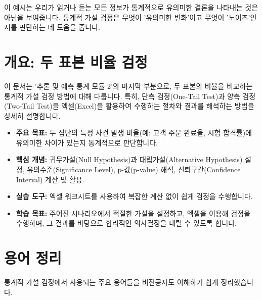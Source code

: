 \documentclass[11pt,a4paper]{book}
\theoremstyle{definition}
\begin{document}
\begin{warningbox}[title=통계적 유의성과 뉴스 가치]
이 예시는 우리가 읽거나 듣는 모든 정보가 통계적으로 유의미한 결론을 나타내는 것은 아님을 보여줍니다. 통계적 가설 검정은 무엇이 '유의미한 변화'이고 무엇이 '노이즈'인지를 판단하는 데 도움을 줍니다.
\end{warningbox}


\section{개요: 두 표본 비율 검정}

이 문서는 '추론 및 예측 통계 모듈 2'의 마지막 부분으로, 두 표본의 비율을 비교하는 통계적 가설 검정 방법에 대해 다룹니다. 특히, 단측 검정(One-Tail Test)과 양측 검정(Two-Tail Test)을 엑셀(Excel)을 활용하여 수행하는 절차와 결과를 해석하는 방법을 상세히 설명합니다.

\begin{itemize}
    \item \textbf{주요 목표:} 두 집단의 특정 사건 발생 비율(예: 고객 주문 완료율, 시험 합격률)에 유의미한 차이가 있는지 통계적으로 판단합니다.
    \item \textbf{핵심 개념:} 귀무가설(Null Hypothesis)과 대립가설(Alternative Hypothesis) 설정, 유의수준(Significance Level), p-값(p-value) 해석, 신뢰구간(Confidence Interval) 계산 및 활용.
    \item \textbf{실습 도구:} 엑셀 워크시트를 사용하여 복잡한 계산 없이 쉽게 검정을 수행합니다.
    \item \textbf{학습 목표:} 주어진 시나리오에서 적절한 가설을 설정하고, 엑셀을 이용해 검정을 수행하며, 그 결과를 바탕으로 합리적인 의사결정을 내릴 수 있도록 합니다.
\end{itemize}


\section{용어 정리}

통계적 가설 검정에서 사용되는 주요 용어들을 비전공자도 이해하기 쉽게 정리했습니다.
\end{document}
